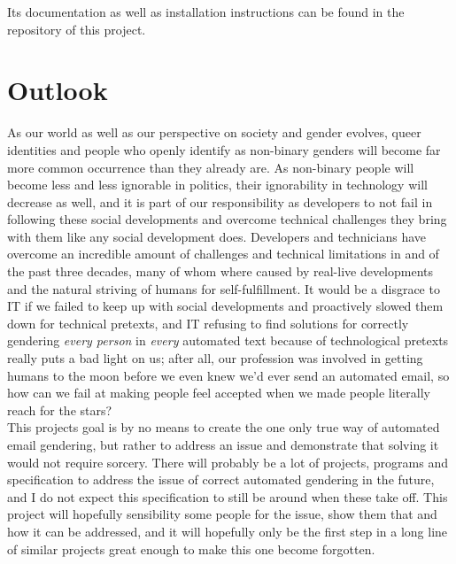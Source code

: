 \documentclass{article}
\begin{document}
    Its documentation as well as installation instructions can be found in the repository of this project.\\

\section{Outlook}

    As our world as well as our perspective on society and gender evolves, queer identities and people who openly identify as non-binary genders will become far more common occurrence than they already are.
    As non-binary people will become less and less ignorable in politics, their ignorability in technology will decrease as well, and it is part of our responsibility as developers to not fail in following these social developments and overcome technical challenges they bring with them like any social development does.
    Developers and technicians have overcome an incredible amount of challenges and technical limitations in and of the past three decades, many of whom where caused by real-live developments and the natural striving of humans for self-fulfillment.
    It would be a disgrace to IT if we failed to keep up with social developments and proactively slowed them down for technical pretexts, and IT refusing to find solutions for correctly gendering \emph{every person} in \emph{every} automated text because of technological pretexts really puts a bad light on us;
    after all, our profession was involved in getting humans to the moon before we even knew we'd ever send an automated email, so how can we fail at making people feel accepted when we made people literally reach for the stars? \\

    This projects goal is by no means to create the one only true way of automated email gendering, but rather to address an issue and demonstrate that solving it would not require sorcery.
    There will probably be a lot of projects, programs and specification to address the issue of correct automated gendering in the future, and I do not expect this specification to still be around when these take off.
    This project will hopefully sensibility some people for the issue, show them that and how it can be addressed, and it will hopefully only be the first step in a long line of similar projects great enough to make this one become forgotten.\\
\end{document}
